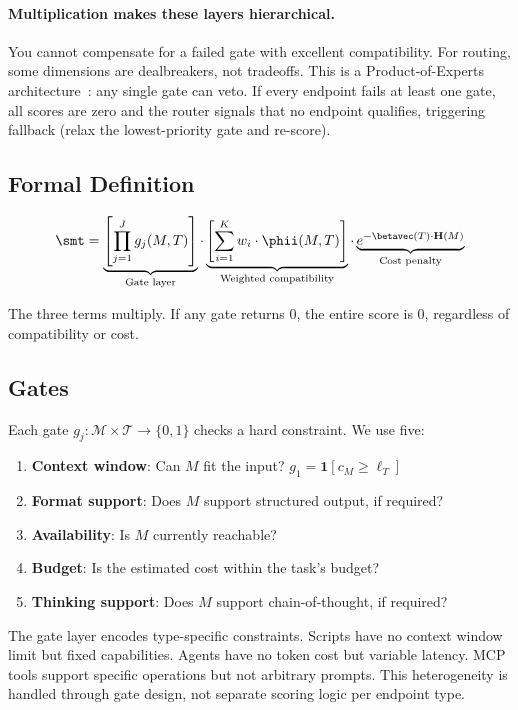 \paragraph{Multiplication makes these layers hierarchical.} You cannot compensate for a failed gate with excellent compatibility. For routing, some dimensions are dealbreakers, not tradeoffs. This is a Product-of-Experts architecture~\citep{hinton2002poe}: any single gate can veto. If every endpoint fails at least one gate, all scores are zero and the router signals that no endpoint qualifies, triggering fallback (relax the lowest-priority gate and re-score).

\subsection{Formal Definition}

\begin{equation}
\label{eq:smt}
\smt = \underbrace{\left[\prod_{j=1}^{J} g_j(M,T)\right]}_{\text{Gate layer}} \cdot \underbrace{\left[\sum_{i=1}^{K} w_i \cdot \phii(M,T)\right]}_{\text{Weighted compatibility}} \cdot \underbrace{e^{-\betavec(T) \cdot \mathbf{H}(M)}}_{\text{Cost penalty}}
\end{equation}

The three terms multiply. If any gate returns 0, the entire score is 0, regardless of compatibility or cost.

\subsection{Gates}

Each gate $g_j: \mathcal{M} \times \mathcal{T} \to \{0, 1\}$ checks a hard constraint. We use five:

\begin{enumerate}
    \item \textbf{Context window}: Can $M$ fit the input? $g_1 = \mathbf{1}[c_M \geq \ell_T]$
    \item \textbf{Format support}: Does $M$ support structured output, if required?
    \item \textbf{Availability}: Is $M$ currently reachable?
    \item \textbf{Budget}: Is the estimated cost within the task's budget?
    \item \textbf{Thinking support}: Does $M$ support chain-of-thought, if required?
\end{enumerate}

The gate layer encodes type-specific constraints. Scripts have no context window limit but fixed capabilities. Agents have no token cost but variable latency. MCP tools support specific operations but not arbitrary prompts. This heterogeneity is handled through gate design, not separate scoring logic per endpoint type.

